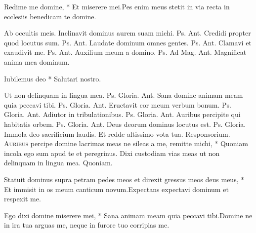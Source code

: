 \begin{multicols*}{2}
\begin{responsory-breve}
{Redime me domine, * Et miserere mei.}{Pes enim meus stetit in via recta in ecclesiis benedicam te domine.}
\end{responsory-breve}
\V Ab occultis meis.
 Inclinavit dominus aurem suam michi. {\color{Red} Ps.}  {\color{Red} Ant.} Credidi propter quod locutus sum. {\color{Red} Ps.}  {\color{Red} Ant.} Laudate dominum omnes gentes. {\color{Red} Ps.}  {\color{Red} Ant.} Clamavi et exaudivit me. {\color{Red} Ps.}  {\color{Red} Ant.} Auxilium meum a domino. {\color{Red} Ps.}  {\color{Red} Ad Mag. Ant.} Magnificat anima mea dominum.
{\color{Red} }
\par {}
\begin{invitatory}
{Iubilemus deo * Salutari nostro.}
\end{invitatory}
 Ut non delinquam in lingua mea. {\color{Red} Ps.}   Gloria. {\color{Red} Ant.} Sana domine animam meam quia peccavi tibi. {\color{Red} Ps.}   Gloria. {\color{Red} Ant.} Eructavit cor meum verbum bonum. {\color{Red} Ps.}   Gloria. {\color{Red} Ant.} Adiutor in tribulationibus. {\color{Red} Ps.}   Gloria. {\color{Red} Ant.} Auribus percipite qui habitatis orbem. {\color{Red} Ps.}   Gloria. {\color{Red} Ant.} Deus deorum dominus locutus est. {\color{Red} Ps.}   Gloria. \V Immola deo sacrificium laudis. \R Et redde altissimo vota tua. {\color{Red} Responsorium.}
\lettrine[lines=2]{\zallmancaps \color{Red} A}{uribus} \hypertarget{auribus-percipe}{\label{auribus-percipe}} percipe domine lacrimas meas ne sileas a me, remitte michi, * Quoniam incola ego sum apud te et peregrinus. \V Dixi custodiam vias meas ut non delinquam in lingua mea. Quoniam.
\begin{responsory}
{Statuit dominus supra petram pedes meos et direxit gressus meos deus meus, * Et immisit in os meum canticum novum.}{Expectans expectavi dominum et respexit me.}
\end{responsory}
\begin{responsory-doxology}
{Ego dixi domine miserere mei, * Sana animam meam quia peccavi tibi.}{Domine ne in ira tua arguas me, neque in furore tuo corripias me.}

\end{responsory-doxology}
\end{multicols*}
